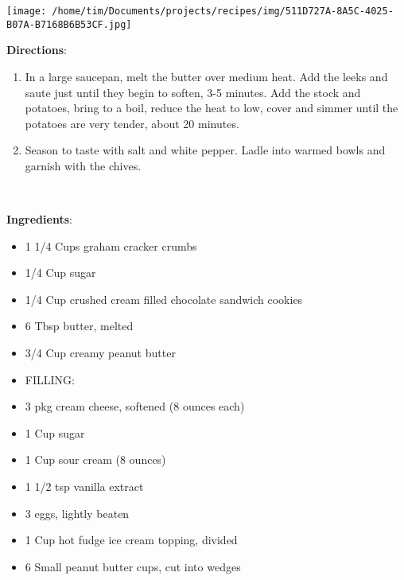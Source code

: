 \documentclass[11pt, twoside, openany]{book}
\begin{document}
\begin{minipage}[t]{0.2\linewidth}
\centering \strut\vspace*{-\baselineskip}\newline
\texttt{[image: /home/tim/Documents/projects/recipes/img/511D727A-8A5C-4025-B07A-B7168B6B53CF.jpg]}\\
\end{minipage}\vspace{3mm}
\textbf{Directions}:
\vspace{-3mm}\begin{enumerate}\setlength\itemsep{-1mm}
\item In a large saucepan, melt the butter over medium heat. Add the leeks and saute just until they begin to soften, 3-5 minutes. Add the stock and potatoes, bring to a boil, reduce the heat to low, cover and simmer until the potatoes are very tender, about 20 minutes. 
\item Season to taste with salt and white pepper. Ladle into warmed bowls and garnish with the chives.
\end{enumerate}
 \label{peanut-butter-cup-cheesecake-recipe}\hfill\textit{}\\
\begin{minipage}[t]{0.8\linewidth}
\textbf{Ingredients}:\vspace{-3mm}
\begin{multicols}{2}
\begin{itemize}\setlength\itemsep{-1mm}
\item 1 1/4 Cups graham cracker crumbs
\item 1/4 Cup sugar
\item 1/4 Cup crushed cream filled chocolate sandwich cookies
\item 6 Tbsp butter, melted
\item 3/4 Cup creamy peanut butter
\item FILLING:
\item 3 pkg cream cheese, softened (8 ounces each)
\item 1 Cup sugar
\item 1 Cup sour cream (8 ounces)
\item 1 1/2 tsp vanilla extract
\item 3 eggs, lightly beaten
\item 1 Cup hot fudge ice cream topping, divided
\item 6 Small peanut butter cups, cut into wedges
\end{itemize}
\end{multicols}
\end{minipage}
\end{document}
